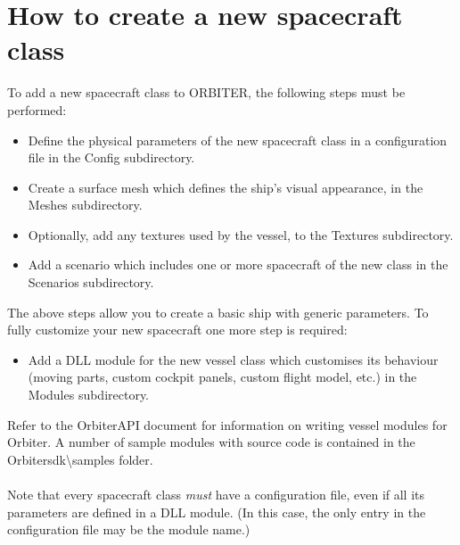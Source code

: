 \documentclass[Orbiter Developer Manual.tex]{subfiles}
\begin{document}
\section{How to create a new spacecraft class}
To add a new spacecraft class to ORBITER, the following steps must be performed:

\begin{itemize}
\item Define the physical parameters of the new spacecraft class in a configuration file in the Config subdirectory.
\item Create a surface mesh which defines the ship's visual appearance, in the Meshes subdirectory.
\item Optionally, add any textures used by the vessel, to the Textures subdirectory.
\item Add a scenario which includes one or more spacecraft of the new class in the Scenarios subdirectory.
\end{itemize}

\noindent
The above steps allow you to create a basic ship with generic parameters. To fully customize your new spacecraft one more step is required:

\begin{itemize}
\item Add a DLL module for the new vessel class which customises its behaviour (moving parts, custom cockpit panels, custom flight model, etc.) in the Modules subdirectory.
\end{itemize}

Refer to the OrbiterAPI document for information on writing vessel modules for Orbiter. A number of sample modules with source code is contained in the Orbitersdk\textbackslash samples folder.\\
\\
Note that every spacecraft class \textit{must} have a configuration file, even if all its parameters are defined in a DLL module. (In this case, the only entry in the configuration file may be the module name.)
\end{document}
